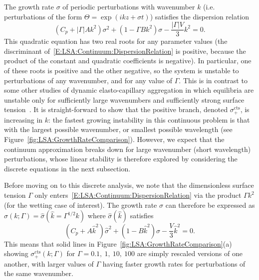 The growth rate $\sigma$ of periodic perturbations with wavenumber $k$ (i.e. perturbations of the form $\Theta = \exp(ikz + \sigma t)$) satisfies the dispersion relation
\begin{equation}\label{E:LSA:Continuum:DispersionRelation}
\left(C_p + |\Gamma| A k^2\right)\sigma^2 + \left(1 - \Gamma B k^2\right) \sigma - \frac{|\Gamma| V}{3}k^2 = 0.
\end{equation}
This quadratic equation has two real roots for any parameter values (the discriminant of~\eqref{E:LSA:Continuum:DispersionRelation} is positive, because the product of the constant and quadratic coefficients is negative). In particular, one of these roots is positive and the other negative, so the system is unstable to perturbations of any wavenumber, and for any value of $\Gamma$. This is in contrast to some other studies of dynamic elasto-capillary aggregation in which equilibria are unstable only for sufficiently large wavenumbers and sufficiently strong surface tension~\citep{Singh2014JFM, Hadjittofis2016JFM}. It is straight-forward to show that the positive branch, denoted $\sigma_+^{\text{cts}}$, is increasing in $k$: the fastest growing instability in this continuous problem is that with the largest possible wavenumber, or smallest possible wavelength (see Figure~\ref{fig:LSA:GrowthRateComparison}). However, we expect that the continuum approximation breaks down for large wavenumber (short wavelength) perturbations, whose linear stability is therefore explored by considering the discrete equations in the next subsection.

Before moving on to this discrete analysis, we note that the dimensionless surface tension $\Gamma$ only enters~\eqref{E:LSA:Continuum:DispersionRelation} via the product $\Gamma k^2$ (for the wetting case of interest). The growth rate $\sigma$ can therefore be expressed as $\sigma(k; \Gamma) = \hat{\sigma}(\hat{k}  = \Gamma^{1/2}k)$ where $\hat{\sigma}(\hat{k})$ satisfies
\begin{equation}\label{E:LSA:Continuum:DispersionRelationRescaled}
\left(C_p +A\hat{k}^2\right)\hat{\sigma}^2 + \left(1 - B\hat{k}^2\right) \hat{\sigma} - \frac{V}{3}\hat{k}^2 = 0.
\end{equation}
This means that solid lines in Figure~\ref{fig:LSA:GrowthRateComparison}(a) showing $\sigma_+^{\text{cts}}(k; \Gamma)$ for $\Gamma = 0.1,~1,~10,~100$ are simply rescaled versions of one another, with larger values of $\Gamma$ having faster growth rates for perturbations of the same wavenumber.

